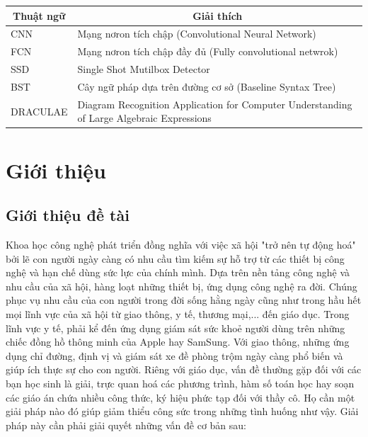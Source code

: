 \documentclass[a4paper,12pt]{article}
\begin{document}
	
	
	\begin{table} [!htb]
		\centering
		\begin{tabular}{| m{4cm} | m{12cm}|}\hline
			\multicolumn{1}{|c|}{\textbf{Thuật ngữ}} & 
			\multicolumn{1}{|c|}{\textbf{Giải thích}}\\\hline
			CNN & Mạng nơron tích chập (Convolutional Neural Network)\\\hline
			FCN & Mạng nơron tích chập đầy đủ (Fully convolutional netwrok) \\\hline
			SSD & Single Shot Mutilbox Detector\\\hline
			BST & Cây ngữ pháp dựa trên đường cơ sở (Baseline Syntax Tree)\\\hline
			DRACULAE & Diagram Recognition Application for Computer Understanding of Large Algebraic Expressions\\\hline
		\end{tabular}
	\end{table}
	
	\newpage
	\section{Giới thiệu}
	\subsection{Giới thiệu đề tài}
	\label{subsec: introduce}
	Khoa học công nghệ phát triển đồng nghĩa với việc xã hội "trở nên tự động hoá" bởi lẽ con người ngày càng có nhu cầu tìm kiếm sự hỗ trợ từ các thiết bị công nghệ và hạn chế dùng sức lực của chính mình. Dựa trên nền tảng công nghệ và nhu cầu của xã hội, hàng loạt những thiết bị, ứng dụng công nghệ ra đời. Chúng phục vụ nhu cầu của con người trong đời sống hằng ngày cũng như trong hầu hết mọi lĩnh vực của xã hội từ giao thông, y tế, thương mại,... đến giáo dục. Trong lĩnh vực y tế, phải kể đến ứng dụng giám sát sức khoẻ người dùng trên những chiếc đồng hồ thông minh của Apple hay SamSung. Với giao thông, những ứng dụng chỉ đường, định vị và giám sát xe đề phòng trộm ngày càng phổ biến và giúp ích thực sự cho con người. Riêng với giáo dục, vấn đề thường gặp đối với các bạn học sinh là giải, trực quan hoá các phương trình, hàm số toán học hay soạn các giáo án chứa nhiều công thức, ký hiệu phức tạp đối với thầy cô. Họ cần một giải pháp nào đó giúp giảm thiểu công sức trong những tình huống như vậy. Giải pháp này cần phải giải quyết những vấn đề cơ bản sau:
	
\end{document}
